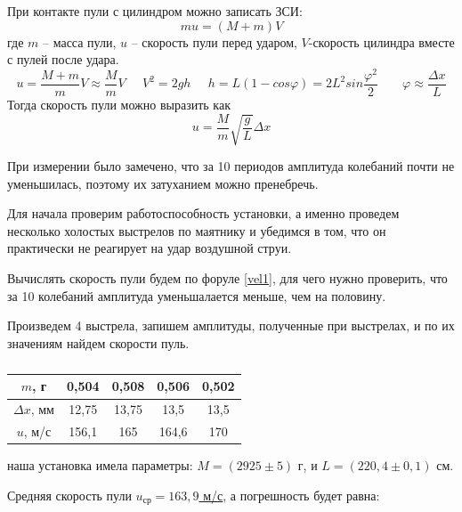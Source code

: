 \documentclass[a4paper,12pt]{article}
\begin{document}
	При контакте пули с цилиндром можно записать ЗСИ:
	\begin{equation}
		 mu = (M+m)V
	\end{equation}
	где $m$ -- масса пули, $u$ -- скорость пули перед ударом, $V$-скорость цилиндра вместе с пулей после удара.
	\begin{equation}
		u=\frac{M+m}{m}V \approx \frac{M}{m}V \;\;\;\;\; V^2=2gh \;\;\;\;\; h = L(1-cos \varphi ) = 2L^2 sin \frac{\varphi^2}{2} \;\;\;\;\;\;\; \varphi \approx \frac{\Delta x}{L} 
	\end{equation}
	Тогда скорость пули можно выразить как
	\begin{equation} \label{vel1}
	 u=\frac{M}{m} \sqrt{\frac{g}{L}} \Delta x
	\end{equation}

	При измерении было замечено, что за 10 периодов амплитуда колебаний почти не уменьшилась, поэтому их затуханием можно пренебречь.
	
	Для начала проверим работоспособность установки, а именно проведем несколько холостых выстрелов по маятнику и убедимся в том, что он практически не реагирует на удар воздушной струи.
	
	Вычислять скорость пули будем по форуле \eqref{vel1}, для чего нужно проверить, что за 10 колебаний амплитуда уменьшалается меньше, чем на половину.
	
	Произведем 4 выстрела, запишем амплитуды, полученные при выстрелах, и по их значениям найдем скорости пуль.
	
	\begin{table}[H]
		\begin{center}
			\begin{tabular}[H]{|c|c|c|c|c|}
				\hline
				$m$, г & 0,504 & 0,508 & 0,506 & 0,502\\ \hline
				$\Delta x$, мм & 12,75 & 13,75 & 13,5 & 13,5\\ \hline
				$u$, м/с & 156,1 & 165 &164,6 &170 \\ \hline
			\end{tabular}
		\caption{}
		\end{center}
	\end{table}
	
	\noindent наша установка имела параметры: $M = (2925 \pm 5)$ г, и $L = (220,4 \pm 0,1)$ см.

	Средняя скорость пули \underline{$u_\text{ср} = 163,9$ м/с}, а погрешность будет равна:
	
\end{document}
